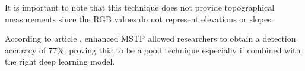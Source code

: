 It is important to note that this technique does not provide topographical measurements since the RGB values do not represent elevations or slopes.

According to article \cite{emstp}, enhanced MSTP allowed researchers to obtain a detection accuracy of 77\%, proving thia to be a good technique especially if combined with the right deep learning model.


